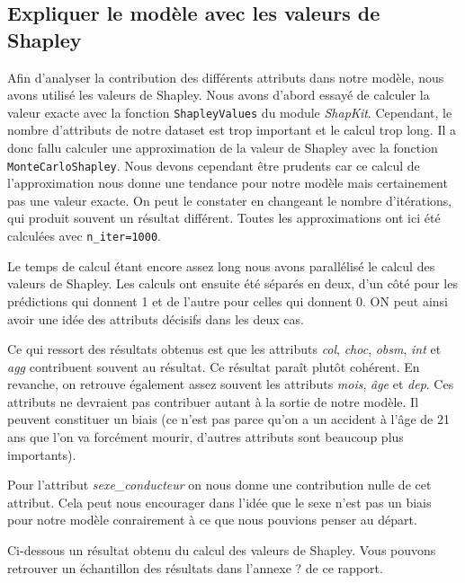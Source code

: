 \documentclass{article}
\begin{document}
    \subsection{Expliquer le modèle avec les valeurs de Shapley}
    Afin d'analyser la contribution des différents attributs dans notre modèle, nous avons 
    utilisé les valeurs de Shapley. Nous avons d'abord essayé de calculer la valeur exacte avec la fonction 
    \verb|ShapleyValues| du module \textit{ShapKit}. Cependant, le nombre d'attributs de notre dataset est trop 
    important et le calcul trop long.
    Il a donc fallu calculer une approximation de la valeur de Shapley avec la fonction \verb|MonteCarloShapley|.
    Nous devons cependant être prudents car ce calcul de l'approximation nous 
    donne une tendance pour notre modèle mais certainement pas une valeur exacte. On peut le constater en changeant 
    le nombre d'itérations, qui produit souvent un résultat différent. Toutes les approximations ont ici été calculées 
    avec \texttt{n\_iter=1000}.

    Le temps de calcul étant encore assez long nous avons parallélisé le calcul des valeurs de Shapley. Les calculs 
    ont ensuite été séparés en deux, d'un côté pour les prédictions qui donnent 1 et de l'autre pour celles qui donnent 0.
    ON peut ainsi avoir une idée des attributs décisifs dans les deux cas.

    Ce qui ressort des résultats obtenus est que les attributs \textit{col}, \textit{choc}, \textit{obsm}, \textit{int} 
    et \textit{agg} contribuent souvent au résultat. Ce résultat paraît plutôt cohérent.
    En revanche, on retrouve également assez souvent les attributs \textit{mois}, \textit{âge} et \textit{dep}. Ces 
    attributs ne devraient pas contribuer autant à la sortie de notre modèle. Il peuvent constituer un biais (ce n'est 
    pas parce qu'on a un accident à l'âge de 21 ans que l'on va forcément mourir, d'autres attributs sont beaucoup plus 
    importants).


    Pour l'attribut \textit{sexe\_conducteur} on nous donne une contribution 
    nulle de cet attribut. Cela peut nous encourager dans l'idée que le sexe n'est pas un biais pour notre modèle 
    conrairement à ce que nous pouvions penser au départ.

    Ci-dessous un résultat obtenu du calcul des valeurs de Shapley. Vous pouvons retrouver un échantillon des résultats dans l'annexe ? de ce rapport.
    
    
\end{document}
